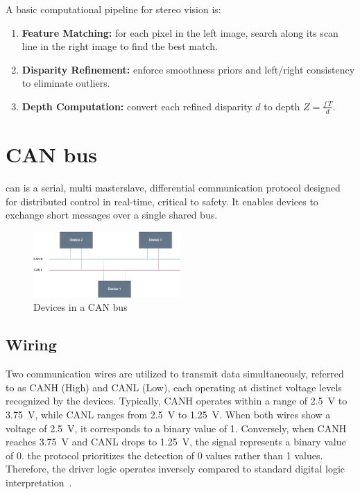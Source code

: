 A basic computational pipeline for stereo vision is:
\begin{enumerate}
  \item \textbf{Feature Matching:} for each pixel in the left image, search along its scan line in the right image to find the best match.
  \item \textbf{Disparity Refinement:} enforce smoothness priors and left/right consistency to eliminate outliers.
  \item \textbf{Depth Computation:} convert each refined disparity \(d\) to depth \(Z = \frac{f\,T}{d}\).
\end{enumerate}

\section{CAN bus}\label{can}

\gls{can} is a serial, multi \gls{masterslave}, differential communication protocol designed for distributed control in real-time, critical to safety. It enables devices to exchange short messages over a single shared bus.

\begin{figure}[H]
  \centering
  \includegraphics[width=0.5\textwidth]{imgs/canbus.png}
  \caption{Devices in a CAN bus}
  \label{fig:cannet}
\end{figure}

\subsection{Wiring}

Two communication wires are utilized to transmit data simultaneously, referred to as CANH (High) and CANL (Low), each operating at distinct voltage levels recognized by the devices. Typically, CANH operates within a range of \SI{2.5}{\volt} to \SI{3.75}{\volt}, while CANL ranges from \SI{2.5}{\volt} to \SI{1.25}{\volt}. When both wires show a voltage of \SI{2.5}{\volt}, it corresponds to a binary value of 1. Conversely, when CANH reaches \SI{3.75}{\volt} and CANL drops to \SI{1.25}{\volt}, the signal represents a binary value of 0. the protocol prioritizes the detection of 0 values rather than 1 values. Therefore, the driver logic operates inversely compared to standard digital logic interpretation~\cite{bosch1991can}.

